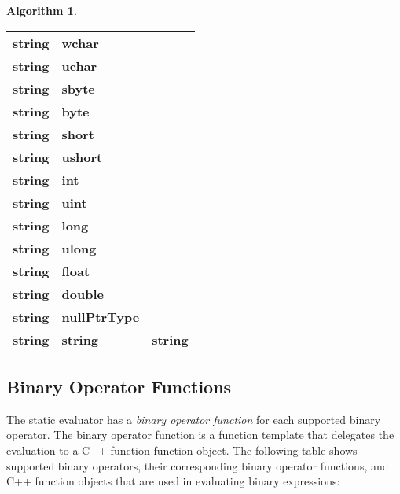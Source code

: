 \documentclass[a4paper,oneside,11pt]{book}
\theoremstyle{definition}
\newtheorem{algo}{Algorithm}[section]
\begin{document}
\begin{algo}
\begin{flushleft}
\begin{supertabular}{lll}
\textbf{string}& \textbf{wchar}& \\
\textbf{string}& \textbf{uchar}& \\
\textbf{string}& \textbf{sbyte}& \\
\textbf{string}& \textbf{byte}& \\
\textbf{string}& \textbf{short}& \\
\textbf{string}& \textbf{ushort}& \\
\textbf{string}& \textbf{int}& \\
\textbf{string}& \textbf{uint}& \\
\textbf{string}& \textbf{long}& \\
\textbf{string}& \textbf{ulong}& \\
\textbf{string}& \textbf{float}& \\
\textbf{string}& \textbf{double}& \\
\textbf{string}& \textbf{nullPtrType}& \\
\textbf{string}& \textbf{string}& \textbf{string}\\
\hline
\end{supertabular}
\end{flushleft}
\end{algo}

\subsection{Binary Operator Functions}

The static evaluator has a \emph{binary operator function} for each supported binary operator.
The binary operator function is a function template that delegates the evaluation to a C++ function function object.
The following table shows supported binary operators, their corresponding binary operator functions, and
C++ function objects that are used in evaluating binary expressions:
\end{document}

